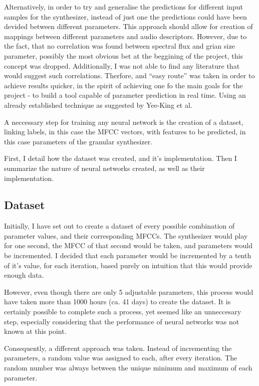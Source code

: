 Alternatively, in order to try and generalise the predictions for
different input samples for the synthesizer, instead of just one the
predictions could have been devided between different parameters. This
approach should allow for creation of mappings between different
parameters and audio descriptors. However, due to the fact, that no
correlation was found between spectral flux and grian size parameter,
possibly the most obvious bet at the beggining of the project, this
concept was dropped. Additionally, I was not able to find any
literature that would suggest such correlations. Therfore, and ``easy
route'' was taken in order to achieve results quicker, in the spirit
of achieving one fo the main goals for the project - to build a tool
capable of parameter prediction in real time. Using an already
established technique as suggested by Yee-King et al.

A neccessary step for training any neural network is the creation of a
dataset, linking labels, in this case the MFCC vectors, with features
to be predicted, in this case parameters of the granular synthesizer.

First, I detail how the dataset was created, and it's
implementation. Then I summarize the nature of neural networks
created, as well as their implementation.

\subsection{Dataset}

Initially, I have set out to create a dataset of every possible
combination of parameter values, and their corresponding MFCCs. The
synthesizer would play for one second, the MFCC of that second would
be taken, and parameters would be incremented. I decided that each
parameter would be incremented by a tenth of it's value, for each
iteration, based purely on intuition that this would provide enough
data.

However, even though there are only 5 adjustable parameters, this
process would have taken more than 1000 hours (ca. 41 days) to create
the dataset. It is certainly possible to complete such a process, yet
seemed like an unneccesary step, especially considering that the
performance of neural networks was not known at this point.

Consequently, a different approach was taken. Instead of incrementing
the parameters, a random value was assigned to each, after every
iteration. The random number was always between the unique minimum and
maximum of each parameter.

